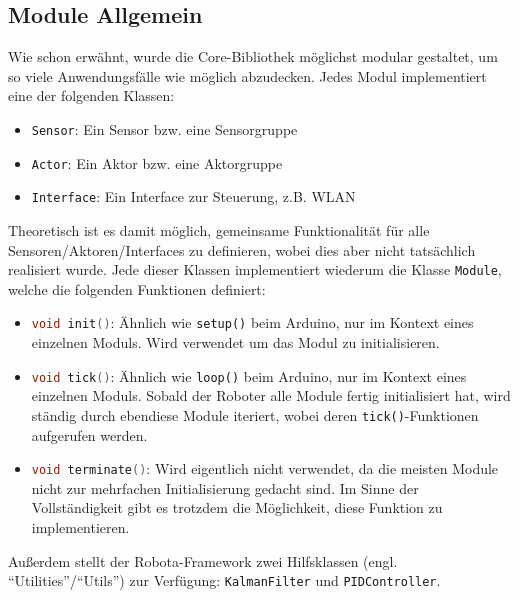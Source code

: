 \subsection{Module Allgemein}
\label{subsec:software_common_modules}
Wie schon erwähnt,
wurde die Core-Bibliothek möglichst modular gestaltet,
um so viele Anwendungsfälle wie möglich abzudecken.
%
Jedes Modul implementiert eine der folgenden Klassen:
\begin{itemize}
    \item \texttt{Sensor}: Ein Sensor bzw. eine Sensorgruppe
    \item \texttt{Actor}: Ein Aktor bzw. eine Aktorgruppe
    \item \texttt{Interface}: Ein Interface zur Steuerung, z.B. WLAN
\end{itemize}
Theoretisch ist es damit möglich,
gemeinsame Funktionalität für alle Sensoren/Aktoren/Interfaces zu definieren,
wobei dies aber nicht tatsächlich realisiert wurde.
%
Jede dieser Klassen implementiert wiederum die Klasse \texttt{Module},
welche die folgenden Funktionen definiert:
\begin{itemize}
    \item \lstinline[language=c]|void init()|:
        Ähnlich wie \texttt{setup()} beim Arduino, nur im Kontext eines einzelnen Moduls.
        Wird verwendet um das Modul zu initialisieren.
    \item \lstinline[language=c]|void tick()|:
        Ähnlich wie \texttt{loop()} beim Arduino, nur im Kontext eines einzelnen Moduls.
        Sobald der Roboter alle Module fertig initialisiert hat,
        wird ständig durch ebendiese Module iteriert,
        wobei deren \texttt{tick()}-Funktionen aufgerufen werden. 
    \item \lstinline[language=c]|void terminate()|:
        Wird eigentlich nicht verwendet,
        da die meisten Module nicht zur mehrfachen Initialisierung gedacht sind.
        Im Sinne der Vollständigkeit gibt es trotzdem die Möglichkeit,
        diese Funktion zu implementieren.
\end{itemize}
Außerdem stellt der Robota-Framework zwei Hilfsklassen (engl. ``Utilities''/``Utils'') zur Verfügung:
\texttt{KalmanFilter} und \texttt{PIDController}.

